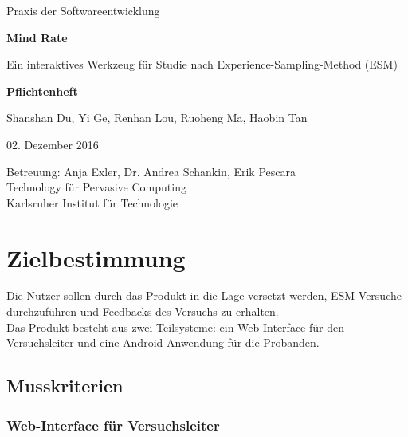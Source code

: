 \documentclass[a4paper]{scrreprt}
\begin{document}
    \begin{center} \large

        Praxis der Softwareentwicklung
        \vspace * {1.5cm}

        \textbf{\huge Mind Rate}

        \vspace*{1cm}

        {\Large Ein interaktives Werkzeug f\"ur Studie nach Experience-Sampling-Method (ESM)}

        \vspace*{1cm}

        \textbf{\Large Pflichtenheft}
        \vspace*{2cm}

        Shanshan Du, Yi Ge, Renhan Lou, Ruoheng Ma, Haobin Tan
        \vspace*{1cm}

        02. Dezember 2016
        \vspace*{2.5cm}


        Betreuung: Anja Exler, Dr. Andrea Schankin, Erik Pescara\\[1cm]
        Technology f\"ur Pervasive Computing\\[0.5cm]
        Karlsruher Institut für Technologie
    \end{center}
    \thispagestyle{empty}

    \tableofcontents

    \chapter{Zielbestimmung}
        Die Nutzer sollen durch das Produkt in die Lage versetzt werden, ESM-Versuche durchzuführen und Feedbacks des Versuchs zu erhalten.\\

        \noindent Das Produkt besteht aus zwei Teilsysteme: ein \gls{Web-Interface} für den \gls{Versuchsleiter} und eine Android-Anwendung für die \gls{Proband}en.


        \section{Musskriterien}
            \subsection{\gls{Web-Interface} für \gls{Versuchsleiter}}
            
\end{document}
